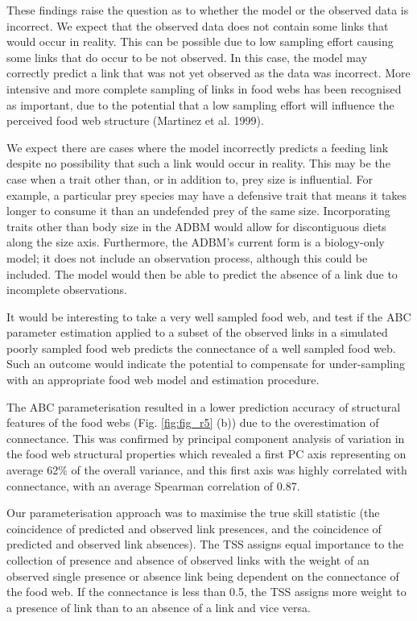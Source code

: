 \documentclass{article}
\begin{document}
These findings raise the question as to whether the model or the
observed data is incorrect. We expect that the observed data does not
contain some links that would occur in reality. This can be possible due
to low sampling effort causing some links that do occur to be not
observed. In this case, the model may correctly predict a link that was
not yet observed as the data was incorrect. More intensive and more
complete sampling of links in food webs has been recognised as
important, due to the potential that a low sampling effort will
influence the perceived food web structure (Martinez et al. 1999).

We expect there are cases where the model incorrectly predicts a feeding
link despite no possibility that such a link would occur in reality.
This may be the case when a trait other than, or in addition to, prey
size is influential. For example, a particular prey species may have a
defensive trait that means it takes longer to consume it than an
undefended prey of the same size. Incorporating traits other than body
size in the ADBM would allow for discontiguous diets along the size
axis. Furthermore, the ADBM's current form is a biology-only model; it
does not include an observation process, although this could be
included. The model would then be able to predict the absence of a link
due to incomplete observations.

It would be interesting to take a very well sampled food web, and test
if the ABC parameter estimation applied to a subset of the observed
links in a simulated poorly sampled food web predicts the connectance of
a well sampled food web. Such an outcome would indicate the potential to
compensate for under-sampling with an appropriate food web model and
estimation procedure.

The ABC parameterisation resulted in a lower prediction accuracy of
structural features of the food webs (Fig. \ref{fig:fig_r5} (b)) due to
the overestimation of connectance. This was confirmed by principal
component analysis of variation in the food web structural properties
which revealed a first PC axis representing on average 62\% of the
overall variance, and this first axis was highly correlated with
connectance, with an average Spearman correlation of 0.87.

Our parameterisation approach was to maximise the true skill statistic
(the coincidence of predicted and observed link presences, and the
coincidence of predicted and observed link absences). The TSS assigns
equal importance to the collection of presence and absence of observed
links with the weight of an observed single presence or absence link
being dependent on the connectance of the food web. If the connectance
is less than 0.5, the TSS assigns more weight to a presence of link than
to an absence of a link and vice versa.
\end{document}
